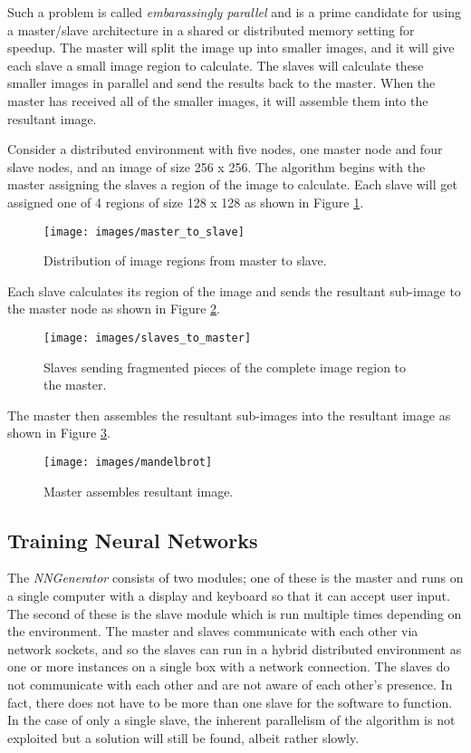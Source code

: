 Such a problem is called {\it embarassingly parallel} and is a prime candidate for using a master/slave architecture in a shared or distributed memory setting for speedup. 
The master will split the image up into smaller images, and it will give each slave a small image region to calculate. 
The slaves will calculate these smaller images in parallel and send the results back to the master. 
When the master has received all of the smaller images, it will assemble them into the resultant image.

Consider a distributed environment with five nodes, one master node and four slave nodes, and an image of size 256 x 256. 
The algorithm begins with the master assigning the slaves a region of the image to calculate. 
Each slave will get assigned one of 4 regions of size 128 x 128 as shown in Figure \ref{m2s}.

\begin{figure}[htb!]
  \centering
  \texttt{[image: images/master\_to\_slave]}
  \caption{Distribution of image regions from master to slave.}
  \label{m2s}
\end{figure}

Each slave calculates its region of the image and sends the resultant sub-image to the master node as shown in Figure \ref{s2m}.

\begin{figure}[htb!]
  \centering
  \texttt{[image: images/slaves\_to\_master]}
  \caption{Slaves sending fragmented pieces of the complete image region to the master.}
  \label{s2m}
\end{figure}

The master then assembles the resultant sub-images into the resultant image as shown in Figure \ref{resultant_image}. 

\begin{figure}[htb!]
  \centering
  \texttt{[image: images/mandelbrot]}
  \caption{Master assembles resultant image.}
  \label{resultant_image}
\end{figure}

\subsection{Training Neural Networks}
The {\em NNGenerator} consists of two modules; one of these is the master and runs on a single computer with a display and keyboard so that it can accept user input.
The second of these is the slave module which is run multiple times depending on the environment.
The master and slaves communicate with each other via network sockets, and so the slaves can run in a hybrid distributed environment as one or more instances on a single box with a network connection.
The slaves do not communicate with each other and are not aware of each other's presence.
In fact, there does not have to be more than one slave for the software to function.
In the case of only a single slave, the inherent parallelism of the algorithm is not exploited but a solution will still be found, albeit rather slowly.

